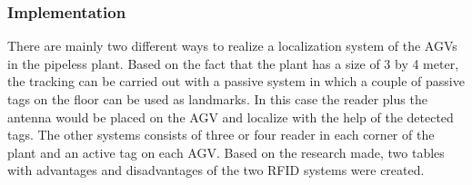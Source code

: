 \subsubsection*{Implementation}
There are mainly two different ways to realize a localization system of the AGVs in the pipeless plant. Based on the fact that the plant has a size of 3 by 4 meter, the tracking can be carried out with a passive system in which a couple of passive tags on the floor can be used as landmarks. In this case the reader plus the antenna would be placed on the AGV and localize with the help of the detected tags. The other systems consists of three or four reader in each corner of the plant and an active tag on each AGV.
Based on the research made, two tables with advantages and disadvantages of the two RFID systems were created.\\ 
